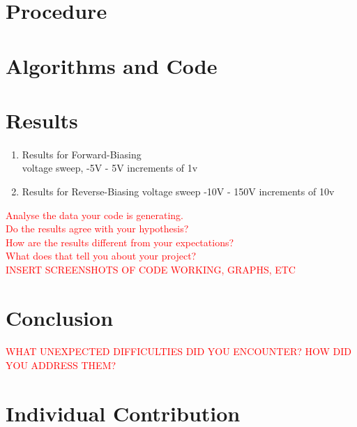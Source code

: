 \documentclass[a4paper]{article}
\begin{document}
\section{Procedure}
\paragraph{}


\section{Algorithms and Code}
\paragraph{}


\section{Results}
\paragraph{}
\begin{enumerate}
\item Results for Forward-Biasing\\
voltage sweep, -5V - 5V
increments of 1v
\item Results for Reverse-Biasing
voltage sweep -10V - 150V
increments of 10v
\end{enumerate}
 \textcolor{red}{Analyse the data your code is generating. 
    \\Do the results agree with your hypothesis? \\
    How are the results different from your expectations?\\
    What does that tell you about your project?}\\
\textcolor{red}{INSERT SCREENSHOTS OF CODE WORKING, GRAPHS, ETC}



\section{Conclusion}
\paragraph{}
\textcolor{red}{WHAT UNEXPECTED DIFFICULTIES DID YOU ENCOUNTER? HOW DID YOU ADDRESS THEM?}

\section{Individual Contribution}
\end{document}
